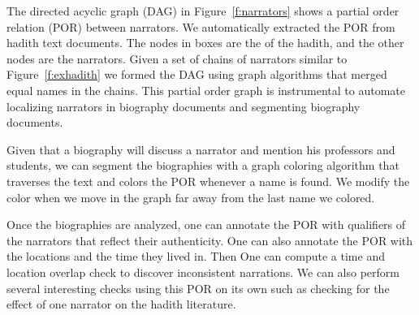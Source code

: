 \documentclass[12pt]{article}
\begin{document}
\begin{figure}[tb]
\end{figure}

The directed acyclic graph (DAG) 
in Figure~\ref{f:narrators} shows a partial order relation (POR) between
narrators.
We automatically extracted the POR from hadith text 
documents.
The nodes in boxes are the  of the hadith, 
and the other nodes are the narrators.
Given a set of chains of narrators similar to 
Figure~\ref{f:exhadith} we formed the DAG using graph algorithms 
that merged equal names in the chains. 
This partial order graph is instrumental to automate
localizing narrators in biography documents and
segmenting biography documents.

Given that a biography will discuss a narrator and mention
his professors and students,
we can segment the biographies with a graph coloring algorithm 
that traverses the text and colors the POR whenever
a name is found. 
We modify the color when we move in the graph 
far away from the last name we colored.

Once the biographies are analyzed, one can annotate
the POR with qualifiers of the narrators that reflect
their authenticity. 
One can also annotate the POR with the locations and 
the time they lived in. 
Then One can compute a time and location overlap
check to discover inconsistent narrations.
We can also perform several interesting checks using 
this POR on its own such as checking for the effect of
one narrator on the hadith literature. 
\end{document}
